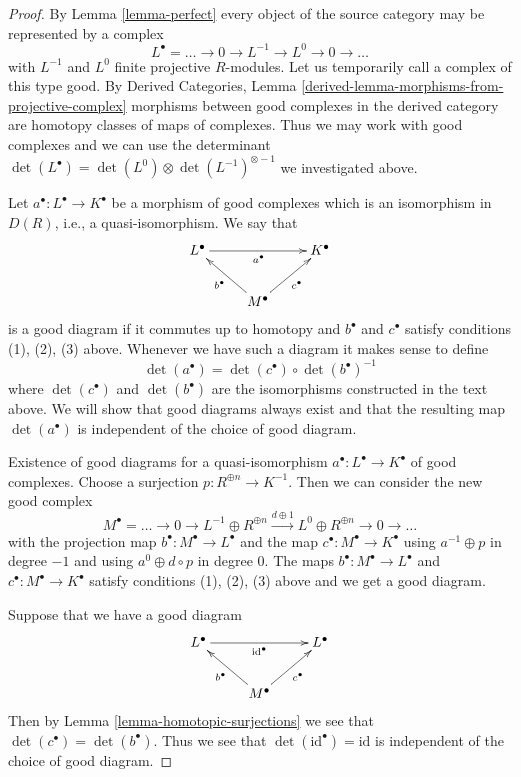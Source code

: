 \documentclass[10pt,a4paper]{amsart}
\theoremstyle{plain}
\theoremstyle{definition}
\theoremstyle{remark}
\numberwithin{equation}{subsection}
\begin{document}
\begin{proof}
By Lemma \ref{lemma-perfect} every object of the source category
may be represented by a complex
$$
L^\bullet = \ldots \to 0 \to L^{-1} \to L^0 \to 0 \to \ldots
$$
with $L^{-1}$ and $L^0$ finite projective $R$-modules. Let us temporarily
call a complex of this type good. By 
Derived Categories, Lemma \ref{derived-lemma-morphisms-from-projective-complex}
morphisms between good complexes in the derived category are
homotopy classes of maps of complexes. Thus we may work with good complexes
and we can use the determinant
$\det(L^\bullet) = \det(L^0) \otimes \det(L^{-1})^{\otimes -1}$
we investigated above.

\medskip\noindent
Let $a^\bullet : L^\bullet \to K^\bullet$ be a morphism of good complexes
which is an isomorphism in $D(R)$, i.e., a quasi-isomorphism. We say that
$$
\xymatrix{
L^\bullet \ar[rr]_{a^\bullet} & & K^\bullet \\
& M^\bullet \ar[lu]^{b^\bullet} \ar[ru]_{c^\bullet}
}
$$
is a good diagram if it commutes up to homotopy and $b^\bullet$
and $c^\bullet$ satisfy conditions (1), (2), (3) above. Whenever
we have such a diagram it makes sense to define
$$
\det(a^\bullet) = \det(c^\bullet) \circ \det(b^\bullet)^{-1}
$$
where $\det(c^\bullet)$ and $\det(b^\bullet)$ are the isomorphisms
constructed in the text above. We will show that good diagrams always
exist and that the resulting map $\det(a^\bullet)$
is independent of the choice of good diagram.

\medskip\noindent
Existence of good diagrams for a quasi-isomorphism
$a^\bullet : L^\bullet \to K^\bullet$ of good complexes.
Choose a
surjection $p : R^{\oplus n} \to K^{-1}$. Then we can consider the new
good complex
$$
M^\bullet = \ldots \to 0 \to
L^{-1} \oplus R^{\oplus n} \xrightarrow{d \oplus 1}
L^0 \oplus R^{\oplus n} \to 0 \to \ldots
$$
with the projection map $b^\bullet : M^\bullet \to L^\bullet$ and the map
$c^\bullet : M^\bullet \to K^\bullet$ using $a^{-1} \oplus p$ in degree $-1$
and using $a^0 \oplus d \circ p$ in degree $0$. The maps
$b^\bullet : M^\bullet \to L^\bullet$ and
$c^\bullet : M^\bullet \to K^\bullet$
satisfy conditions (1), (2), (3) above and we get a good diagram.

\medskip\noindent
Suppose that we have a good diagram
$$
\xymatrix{
L^\bullet \ar[rr]_{\text{id}^\bullet} & & L^\bullet \\
& M^\bullet \ar[lu]^{b^\bullet} \ar[ru]_{c^\bullet}
}
$$
Then by Lemma \ref{lemma-homotopic-surjections} we see that
$\det(c^\bullet) = \det(b^\bullet)$. Thus we see that
$\det(\text{id}^\bullet) = \text{id}$ is independent of the choice
of good diagram.


\end{proof}
\end{document}
